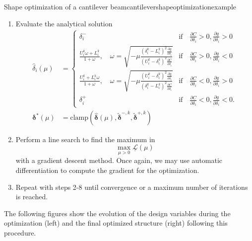 \begin{example}{Shape optimization of a cantilever beam}{cantilevershapeoptimizationexample}
\begin{enumerate}
        \item Evaluate the analytical solution
            \begin{align}
                \hat{\delta}_i(\mu) &= 
                \begin{cases}
                    \delta^-_i 
                        &\textrm{if} \quad \frac{\partial C}{\partial \delta_i} > 0, \frac{\partial g}{\partial \delta_i} > 0 \\
                    \frac{U_i^k\omega + L_i^k}{1+\omega}, \quad \omega = \sqrt{-\mu\frac{(\delta_i^k-L_i^k)^2\frac{\partial g}{\partial \delta_i}}{(U_i^k-\delta_i^k)^2\frac{\partial C}{\partial \delta_i}}}
                        &\textrm{if} \quad \frac{\partial C}{\partial \delta_i}  > 0, \frac{\partial g}{\partial \delta_i} <0\\
                    \frac{U_i^k+L_i^k\omega}{1+\omega}, \quad \omega = \sqrt{-\mu\frac{(U_i^k-\delta_i^k)^2\frac{\partial g}{\partial \delta_i}}{(\delta_i^k-L_i^k)^2\frac{\partial C}{\partial \delta_i}}} 
                        &\textrm{if} \quad \frac{\partial C}{\partial \delta_i} < 0, \frac{\partial g}{\partial \delta_i}  > 0\\
                    \delta^+_i 
                        &\textrm{if} \quad \frac{\partial C}{\partial \delta_i}< 0, \frac{\partial g}{\partial \delta_i} < 0.
                \end{cases} \\
                \pmb{\delta}^* (\mu) &= \textrm{clamp}\left(\hat{\pmb{\delta}}(\mu), \tilde{\pmb{\delta}}^{-,k}, \tilde{\pmb{\delta}}^{+,k}\right)
            \end{align}
        \item Perform a line search to find the maximum in 
            \begin{equation}
                \max_{\mu>0} \underline{\mathcal{L}}(\mu)
            \end{equation}
            with a gradient descent method. Once again, we may use automatic differentiation to compute the gradient for the optimization.
        \item Repeat with steps 2-8 until convergence or a maximum number of iterations is reached.
    \end{enumerate}
    
    The following figures show the evolution of the design variables during the optimization (left) and the final optimized structure (right) following this procedure. 

    \begin{minipage}{.5\textwidth}
        \centering
        
    \end{minipage}%
    \begin{minipage}{.5\textwidth}
        \centering
        
    \end{minipage}
       
\end{example}



 